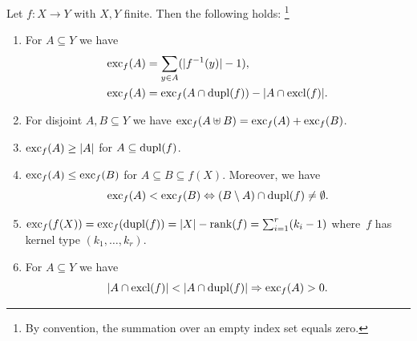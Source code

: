 \begin{proposition} \label{prelim:prop:excess}
	\label{prelim:eqn:dupl-inequality} \label{prelim:cor:finvA} \label{prelim:prop:finvA}
	Let $f \colon X \to Y$ with $X,Y$ finite.
	Then the following holds:%
	\footnote{By convention, the summation over an empty index set equals zero.}
	\begin{enumerate}
		\item \label{prelim:prop:excess:sum} For $A \subseteq Y$ we have
		\begin{align}
			\operatorname{exc}_{f}(A) & = \sum_{y \in A} ( |f^{-1}(y)| - 1 ),  \label{prelim:eqn:sumAfinv1} \\
			\operatorname{exc}_{f}(A) & = \operatorname{exc}_{f}(A \cap \operatorname{dupl}(f)) - |A \cap \operatorname{excl}(f)|. \label{prelim:eqn:sumAfinv2}
		\end{align}
		
		\item \label{prelim:prop:excess:additive} For disjoint $A, B \subseteq Y$ we have $\operatorname{exc}_{f}(A \uplus B) = \operatorname{exc}_{f}(A) + \operatorname{exc}_{f}(B)$.
		
		\item \label{prelim:eqn:dupl-inequality:1} $\operatorname{exc}_{f}(A) \ge |A|$ for $A \subseteq \operatorname{dupl}(f)$.
		
		\item \label{prelim:eqn:dupl-inequality:2} $\operatorname{exc}_{f}(A) \le \operatorname{exc}_{f}(B)$
		for $A \subseteq B \subseteq f(X)$. Moreover, we have
		\[
		\operatorname{exc}_{f}(A) < \operatorname{exc}_{f}(B)
		\Leftrightarrow 
		(B \setminus A) \cap \operatorname{dupl}(f) \ne \emptyset.
		\]
		\item \label{prelim:eqn:dupl-inequality:5}
		$\operatorname{exc}_{f}(f(X)) = \operatorname{exc}_{f}(\operatorname{dupl}(f)) = |X| - \operatorname{rank}(f) = \sum_{i=1}^{r} (k_i - 1)$
		where~$f$ has kernel type $(k_1, \ldots, k_r)$.	
		
		\item \label{prelim:eqn:dupl-inequality:4} For $A \subseteq Y$ we have
		\begin{equation} \label{eqn:inverse-image-larger-sufficient}
			|A \cap \operatorname{excl}(f)| < |A \cap \operatorname{dupl}(f)|
			\Rightarrow
			\operatorname{exc}_{f}(A) > 0.
		\end{equation}
	\end{enumerate}
\end{proposition}
